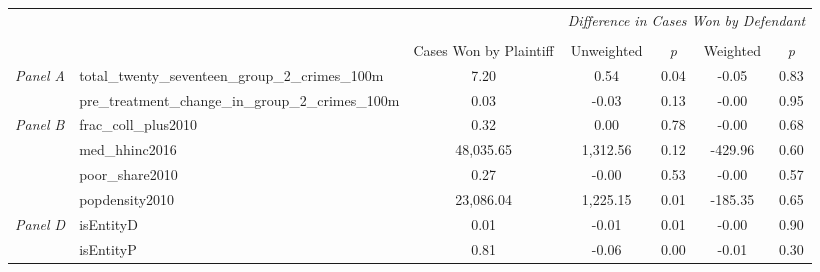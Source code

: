 \begin{tabular}{llccccc}
\toprule
 &  & \textit{} & \multicolumn{4}{c}{\textit{Difference in Cases Won by Defendant}} \\
\cline{4-7}
\\
 &  & Cases Won by Plaintiff & Unweighted & \emph{p} & Weighted & \emph{p} \\
\midrule
\multirow[c]{2}{3cm}{\textit{Panel A}} & total_twenty_seventeen_group_2_crimes_100m & 7.20 & 0.54 & 0.04 & -0.05 & 0.83 \\
 & pre_treatment_change_in_group_2_crimes_100m & 0.03 & -0.03 & 0.13 & -0.00 & 0.95 \\
\cline{1-7}
\multirow[c]{4}{3cm}{\textit{Panel B}} & frac_coll_plus2010 & 0.32 & 0.00 & 0.78 & -0.00 & 0.68 \\
 & med_hhinc2016 & 48,035.65 & 1,312.56 & 0.12 & -429.96 & 0.60 \\
 & poor_share2010 & 0.27 & -0.00 & 0.53 & -0.00 & 0.57 \\
 & popdensity2010 & 23,086.04 & 1,225.15 & 0.01 & -185.35 & 0.65 \\
\cline{1-7}
\multirow[c]{2}{3cm}{\textit{Panel D}} & isEntityD & 0.01 & -0.01 & 0.01 & -0.00 & 0.90 \\
 & isEntityP & 0.81 & -0.06 & 0.00 & -0.01 & 0.30 \\
\cline{1-7}
\bottomrule
\end{tabular}
